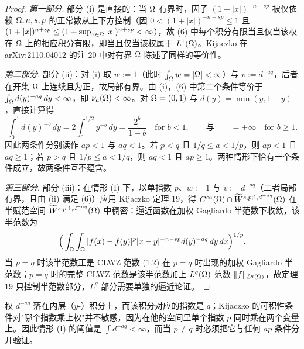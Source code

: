 \begin{proof}
\emph{第一部分}. 部分 (i) 是直接的：当 $\Omega$ 有界时，因子 $(1+|x|)^{-n-sp}$ 被仅依赖 $\Omega,n,s,p$ 的正常数从上下方控制（因 $0<(1+|x|)^{-n-sp}\le1$ 且 $(1+|x|)^{n+sp}\le(1+\sup_{x\in\Omega}|x|)^{n+sp}<\infty$），故 (6) 中每个积分有限当且仅当该权在 $\Omega$ 上的相应积分有限，即当且仅当该权属于 $L^1(\Omega)$。Kijaczko 在 arXiv:2110.04012 的注 20 中对有界 $\Omega$ 陈述了同样的等价性。

\emph{第二部分}. 部分 (ii)：对 (i) 取 $w:=1$（此时 $\int_\Omega w=|\Omega|<\infty$）与 $v:=d^{-aq}$，后者在开集 $\Omega$ 上连续且为正，故局部有界。由 (i)，(6) 中第二个条件等价于 $\int_\Omega d(y)^{-aq}\,dy<\infty$，即 $\nu_{a}(\Omega)<\infty$。对 $\Omega=(0,1)$ 与 $d(y)=\min(y,1-y)$，直接计算得
\[
  \int_0^1 d(y)^{-b}\,dy=2\int_0^{1/2}y^{-b}\,dy=\frac{2^b}{1-b}
  \quad\text{for } b<1,
  \qquad\text{与}\qquad =+\infty \quad\text{for } b\ge1 .
\]
因此两条件分别读作 $ap<1$ 与 $aq<1$。若 $p<q$ 且 $1/q\le a<1/p$，则 $ap<1$ 且 $aq\ge1$；若 $p>q$ 且 $1/p\le a<1/q$，则 $aq<1$ 且 $ap\ge1$。两种情形下恰有一个条件成立，故两条件互不蕴含。

\emph{第三部分}. 部分 (iii)：在情形 (I) 下，以单指数 $p$、$w:=1$ 与 $v:=d^{-aq}$（二者局部有界，且由 (ii) 满足 (6)）应用 Kijaczko 定理 19，得 $C^\infty(\Omega)\cap\widetilde W^{s,p;1,d^{-aq}}(\Omega)$ 在半赋范空间 $\widetilde W^{s,p;1,d^{-aq}}(\Omega)$ 中稠密：逼近函数在加权 Gagliardo 半范数下收敛，该半范数为
\[
  \Big(\int_\Omega\int_\Omega|f(x)-f(y)|^p|x-y|^{-n-sp}d(y)^{-aq}\,dy\,dx\Big)^{1/p}.
\]当 $p=q$ 时该半范数正是 CLWZ 范数 (1.2) 在 $p=q$ 时出现的加权 Gagliardo 半范数；$p=q$ 时的完整 CLWZ 范数是该半范数加上 $L^q(\Omega)$ 范数 $\|f\|_{L^q(\Omega)}$，故定理 19 只控制半范数部分，$L^q$ 部分需要单独的逼近论证。
\end{proof}

\begin{remark}[直觉]
权 $d^{-aq}$ 落在内层（$y$-）积分上，而该积分对应的指数是 $q$；Kijaczko 的可积性条件对"哪个指数乘上权"并不敏感，因为在他的空间里单个指数 $p$ 同时乘在两个变量上。因此情形 (I) 的阈值是 $\int d^{-aq}<\infty$，而当 $p\neq q$ 时必须把它与任何 $ap$ 条件分开验证。
\end{remark}
